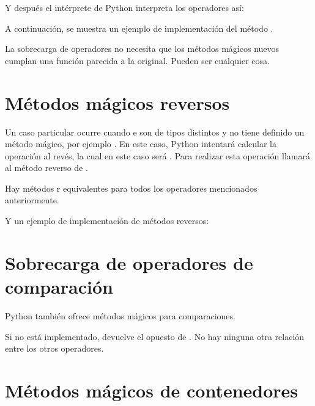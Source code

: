 Y después el intérprete de Python interpreta los operadores así:


A continuación, se muestra un ejemplo de implementación del método .


La sobrecarga de operadores no necesita que los métodos mágicos nuevos cumplan una función parecida a la original. Pueden ser cualquier cosa.\smallskip

\section{Métodos mágicos reversos}

Un caso particular ocurre cuando  e  son de tipos distintos y  no tiene definido un método mágico, por ejemplo . En este caso, Python intentará calcular la operación al revés, la cual en este caso será . Para realizar esta operación llamará al método reverso  de .\smallskip

Hay métodos r equivalentes para todos los operadores mencionados anteriormente.


Y un ejemplo de implementación de métodos reversos:


\section{Sobrecarga de operadores de comparación}

Python también ofrece métodos mágicos para comparaciones.


Si  no está implementado, devuelve el opuesto de . No hay ninguna otra relación entre los otros operadores.


\section{Métodos mágicos de contenedores}

